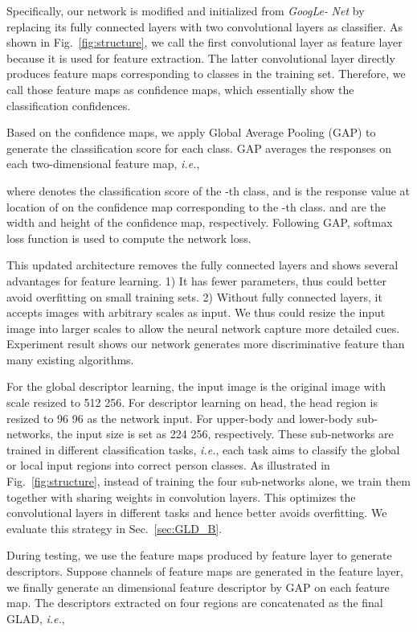 \documentclass[sigconf]{acmart}
\begin{document}
Specifically, our network is modified and initialized from \emph{GoogLe-}
 \emph{Net} \cite{googlenet} by replacing its fully connected layers with two convolutional layers as classifier. As shown in Fig.~\ref{fig:structure}, we call the first convolutional layer as feature layer because it is used for feature extraction. The latter convolutional layer directly produces  feature maps corresponding to  classes in the training set. Therefore, we call those feature maps as confidence maps, which essentially show the classification confidences.

Based on the confidence maps, we apply Global Average Pooling (GAP) to generate the classification score for each class. GAP averages the responses on each two-dimensional feature map, \emph{i.e.},

where  denotes the classification score of the -th class, and  is the response value at location of  on the confidence map corresponding to the -th class.  and  are the width and height of the confidence map, respectively. Following GAP, softmax loss function is used to 
compute the network loss.

This updated architecture removes the fully connected layers and shows several advantages for feature learning. 1) It has fewer parameters, thus could better avoid overfitting on small training sets. 2) Without fully connected layers, it accepts images with arbitrary scales as input. We thus could resize the input image into larger scales to allow the neural network capture more detailed cues. Experiment result shows our network generates more discriminative feature than many existing algorithms.

For the global descriptor learning, the input image is the original image with scale resized to 512  256. For descriptor learning on head, the head region is resized to 96  96 as the network input. For upper-body and lower-body sub-networks, the input size is set as 224  256, respectively. These sub-networks are trained in different classification tasks, \emph{i.e.}, each task aims to classify the global or local input regions into correct person classes. As illustrated in Fig.~\ref{fig:structure}, instead of training the four sub-networks alone, we train them together with sharing weights in convolution layers. This optimizes the convolutional layers in different tasks and hence better avoids overfitting. We evaluate this strategy in Sec.~\ref{sec:GLD_B}.

During testing, we use the feature maps produced by feature layer to generate descriptors. Suppose  channels of feature maps are generated in the feature layer, we finally generate an  dimensional feature descriptor by GAP on each feature map. The descriptors extracted on four regions are concatenated as the final GLAD, \emph{i.e.},
\end{document}
